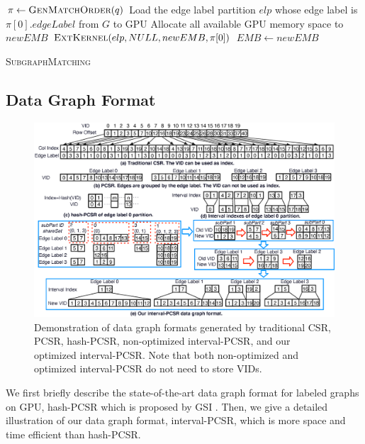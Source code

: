 \begin{algorithm}[t!]
$\pi \leftarrow \textsc{GenMatchOrder}(q)$\;
Load the edge label partition $elp$ whose edge label is $\pi[0].edgeLabel$ from $G$ to GPU\;
Allocate all available GPU memory space to $newEMB$\;
$\textsc{ExtKernel}(elp,NULL,newEMB,\pi[0])$\;
$EMB \leftarrow newEMB$\;
\caption{\textsc{SubgraphMatching}}
\label{algo:submatch}
\end{algorithm}


\subsection{Data Graph Format}
\begin{figure}
\centering
\includegraphics[width=\textwidth]{./figure/graphformat.eps}
\caption{Demonstration of data graph formats generated by traditional CSR, PCSR, hash-PCSR, non-optimized interval-PCSR, and our optimized interval-PCSR. Note that both non-optimized and optimized interval-PCSR do not need to store VIDs.}	
\label{fig:dataformat}
\end{figure}

We first briefly describe the state-of-the-art data graph format for labeled graphs on GPU, hash-PCSR which is proposed by GSI \cite{zeng2020gsi}. Then, we give a detailed illustration of our data graph format, interval-PCSR, which is more space and time efficient than hash-PCSR.
